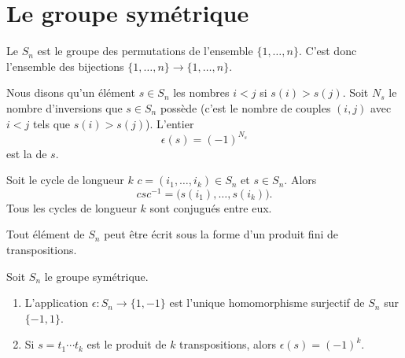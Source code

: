 \section{Le groupe symétrique}

Le  \( S_n\) est le groupe des permutations de l'ensemble \( \{ 1,\ldots,n \}\). C'est donc l'ensemble des bijections \( \{ 1,\ldots, n \}\to\{ 1,\ldots, n \}\).

Nous disons qu'un élément \( s\in S_n\)  les nombres \( i<j\) si \( s(i)>s(j)\). Soit \( N_s\) le nombre d'inversions que \( s\in S_n\) possède (c'est le nombre de couples \( (i,j)\) avec \( i<j\) tels que \( s(i)>s(j)\)). L'entier
\begin{equation}
    \epsilon(s)=(-1)^{N_s}
\end{equation}
est la  de \( s\).

\begin{lemma}        \label{LemmvZFWP}
    Soit le cycle  de longueur \( k\) \( c=(i_1,\ldots, i_k)\in S_n\) et \( s\in S_n\). Alors
    \begin{equation}
        csc^{-1}=\big( s(i_1),\ldots, s(i_k) \big).
    \end{equation}
    Tous les cycles de longueur \( k\) sont conjugués entre eux.
\end{lemma}

\begin{proposition} \label{PropPWIJbu}
    Tout élément de \( S_n\) peut être écrit sous la forme d'un produit fini de transpositions.
\end{proposition}

\begin{proposition}  \label{ProphIuJrC}
    Soit \( S_n\) le groupe symétrique.
    \begin{enumerate}
        \item
            L'application \( \epsilon\colon S_n\to \{ 1,-1 \}\) est l'unique homomorphisme surjectif de \( S_n\) sur \( \{ -1,1 \}\).
        \item
            Si \( s=t_1\cdots t_k\) est le produit de \( k\) transpositions, alors \( \epsilon(s)=(-1)^k\).
    \end{enumerate}
\end{proposition}

